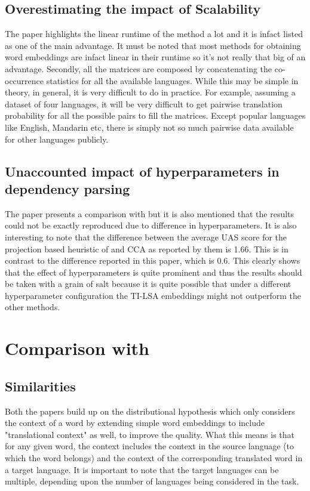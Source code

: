 \documentclass[11pt]{article}
\begin{document}
\subsection{Overestimating the impact of Scalability}
The paper highlights the linear runtime of the method a lot and it is infact listed as one of the main advantage. It must be noted that most methods for obtaining word embeddings are infact linear in their runtime so it's not really that big of an advantage. Secondly, all the matrices are composed by concatenating the co-occurrence statistics for all the available languages. While this may be simple in theory, in general, it is very difficult to do in practice. For example, assuming a dataset of four languages, it will be very difficult to get pairwise translation probability for all the possible pairs to fill the matrices. Except popular languages like English, Mandarin etc, there is simply not so much pairwise data available for other languages publicly.

\subsection{Unaccounted impact of hyperparameters in dependency parsing}
The paper presents a comparison with \cite{guo2015cross} but it is also mentioned that the results could not be exactly reproduced due to difference in hyperparameters. It is also interesting to note that the difference between the average UAS score for the projection based heuristic of \cite{guo2015cross} and CCA as reported by them  is 1.66. This is in contrast to the difference reported in this paper, which is 0.6. This clearly shows that the effect of hyperparameters is quite prominent and thus the results should be taken with a grain of salt because it is quite possible that under a different hyperparameter configuration the TI-LSA embeddings might not outperform the other methods.

\section{Comparison with \cite{faruqui2014improving}}
\subsection{Similarities}
Both the papers build up on the distributional hypothesis which only considers the context of a word by extending simple word embeddings to include "translational context" as well, to improve the quality. What this means is that for any given word, the context includes the context in the source language (to which the word belongs) and the context of the corresponding translated word in a target language. It is important to note that the target languages can be multiple, depending upon the number of languages being considered in the task.
\end{document}
